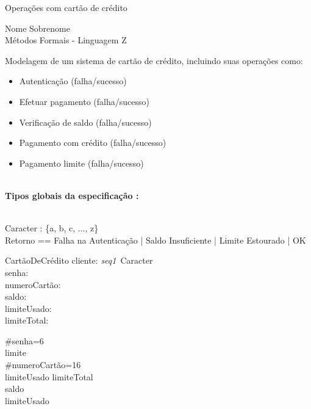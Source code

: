 \documentclass{article}
\begin{document}
\begin{center}
    \huge  Operações com cartão de crédito\\
\end{center}

\begin{center}
    Nome Sobrenome\\
    Métodos Formais - Linguagem Z\\
\end{center}
\vspace{1.5cm}

Modelagem de um sistema de cartão de crédito, incluindo suas operações como:
\begin{itemize}
  \item Autenticação (falha/sucesso)
  \item Efetuar pagamento (falha/sucesso)
  \item Verificação de saldo (falha/sucesso)
  \item Pagamento com crédito (falha/sucesso)
  \item Pagamento limite (falha/sucesso)\\
  \\
\end{itemize}

\textbf{Tipos globais da especificação :}

\begin{zed}
    [CartãoDeCrédito] \\
   Caracter : \{a, b, c, ..., z\}\\
   Retorno == Falha na Autenticação | Saldo Insuficiente | Limite Estourado | OK\\
\end{zed}

\begin{schema}{CartãoDeCrédito}
    cliente: {\it seq1}\ Caracter \\
    senha: \nat \\
    numeroCartão:\nat\\
    saldo: \real\\
    limiteUsado:\real\\
    limiteTotal:\real
    
    \where
    
    \#senha=6\\
    limite \\
    \#numeroCartão=16\\
    limiteUsado \leq limiteTotal\\
    saldo \\
    limiteUsado 
\end{schema}
\end{document}
